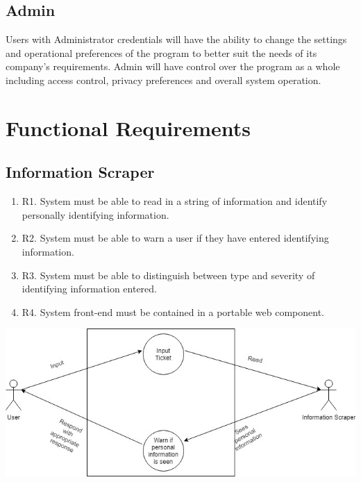 \documentclass[11pt]{article}
\begin{document}
\subsection{Admin}
Users with Administrator credentials will have the ability to change the settings and operational preferences of the program to better suit the needs of its company's requirements. Admin will have control over the program as a whole including access control, privacy preferences and overall system operation.

\section{Functional Requirements}
\subsection{Information Scraper}
\begin{enumerate}
    \item R1. System must be able to read in a string of information and identify personally identifying information.
    \item R2. System must be able to warn a user if they have entered identifying information. 
    \item R3. System must be able to distinguish between type and severity of identifying information entered.
    \item R4. System front-end must be contained in a portable web component.
\end{enumerate}
 \includegraphics[width=1.0\textwidth]{images/Information_Scraper_UCD.jpg}
\end{document}
